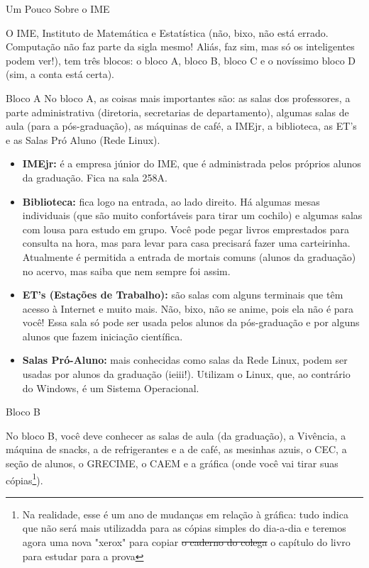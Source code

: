 \begin{secao}{Um Pouco Sobre o IME}

O IME, Instituto de Matemática e Estatística (não, bixo, não está errado.
Computação não faz parte da sigla mesmo! Aliás, faz sim, mas só os inteligentes
podem ver!),  tem três blocos: o bloco A, bloco B, bloco C e o novíssimo bloco D
(sim, a conta está certa).

\begin{subsecao}{Bloco A}
No bloco A, as coisas mais importantes são: as salas dos professores, a parte
administrativa (diretoria, secretarias de departamento), algumas salas de aula
(para a pós-graduação), as máquinas de café, a IMEjr, a biblioteca, as ET's e
as Salas Pró Aluno (Rede Linux).

\begin{itemize}
   \item {\bf IMEjr:} é a empresa júnior do IME, que é administrada pelos próprios
     alunos da graduação. Fica na sala 258A.

   \item {\bf Biblioteca:} fica logo na entrada, ao lado direito. Há algumas mesas 		   	individuais (que são muito confortáveis para tirar um cochilo) e algumas salas com 			lousa para estudo em grupo. Você pode pegar livros emprestados para consulta na 			hora, mas para levar para casa precisará fazer uma carteirinha. Atualmente é 				permitida a entrada de mortais comuns (alunos da graduação) no acervo, mas saiba que 	nem sempre foi assim.

   \item {\bf ET's (Estações de Trabalho):} são salas com alguns terminais 
     que têm acesso à Internet e muito mais. Não, bixo, não se anime,
     pois ela não é para você! Essa sala só pode ser usada pelos alunos
     da pós-graduação e por alguns alunos que fazem iniciação científica.

   \item {\bf Salas Pró-Aluno:} mais conhecidas como salas da Rede Linux,
     podem ser usadas por alunos da graduação (ieiii!). Utilizam o Linux,
     que, ao contrário do Windows, é um Sistema Operacional.
\end{itemize}
\end{subsecao}

\begin{subsecao}{Bloco B}

  No bloco B, você deve conhecer as salas de aula (da graduação), a
  Vivência, a máquina de snacks, a de refrigerantes e a de café,
  as mesinhas azuis, o CEC, a seção de alunos,
  o GRECIME, o CAEM e a gráfica (onde você vai tirar suas cópias\footnote{Na realidade, esse é um ano de mudanças em relação à gráfica: tudo indica que não será mais utilizadda para as cópias simples do dia-a-dia e teremos agora uma nova "xerox" para copiar 
\sout {o caderno do colega} o capítulo do livro para estudar para a prova}).


\end{subsecao}
\end{secao}
